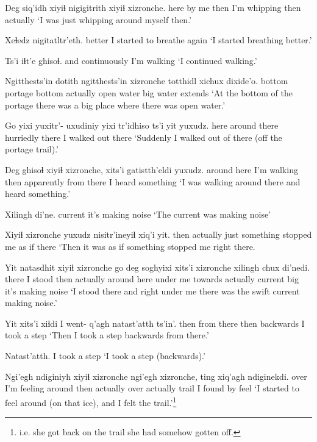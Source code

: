 \documentclass[12pt]{article}
\begin{document}
\gll Deg siq'idh xiyiɬ  nigigitrith xiyiɬ xizronche.
here {by me} then {I'm whipping} then actually
\glt `I was just whipping around myself then.'
\glend

\gll Xeɬedz nigitatltr'eth.
better {I started to breathe again}
\glt `I started breathing better.'
\glend

\gll Ts'i iɬt'e ghisoɬ.
and  continuously {I'm walking}
\glt `I continued walking.'
\glend

\gll Ngitthests'in dotith ngitthests'in xizronche totthidl xichux dixide'o.
bottom        portage bottom       actually        {open water} big  {water extends}
\glt `At the bottom of the portage there was a big place where there was open water.'
\glend

\gll Go   yixi           yuxitr'- uxudiniy yixi tr'idhiso ts'i yit yuxudz.
here {around there} {}       hurriedly there {I walked out} {} there
\glt `Suddenly I walked out of there (off the portage trail).'
\glend

\gll Deg ghisoɬ xiyiɬ xizronche,  xits'i {gatistth'eldi} yuxudz.  
{around here} {I'm walking} then  apparently                    {from there} {I heard something}
\glt `I was walking around there and heard something.'
\glend

\gll Xilingh di'ne. 
current {it's making noise}
\glt `The current was making noise'
\glend

\gll Xiyiɬ xizronche yuxudz nisitr'ineyiɬ xiq'i yit. 
then  actually     just       {something stopped me} {as if} there
\glt `Then it was as if something stopped me right there.
\glend

\gll Yit natasdhit xiyiɬ xizronche {go deg} soghyixi xits'i xizronche xilingh chux di'nedi. 
there {I stood} then  actually      {around here} {under me} towards actually current big {it's making noise}
\glt `I stood there and right under me there was the swift current making noise.'
\glend

\gll Yit xits'i xiɬdi {I went-} q'agh natast'atth ts'in'. 
then {from there} then {}  backwards {I took a step} {} 
\glt `Then I took a step backwards from there.'
\glend

\gll  Natast'atth.
 {I took a step}
\glt `I took a step (backwards).'
\glend

\gll Ngi'egh ndiginiyh xiyiɬ xizronche ngi'egh xizronche, ting {xiq'agh ndiginekdi.} 
over    {I'm feeling around} then actually over actually trail {I found by feel}
\glt `I started to feel around (on that ice), and I felt the trail.'\footnote{i.e. she got back on the trail she had somehow gotten off.}
\glend
\end{document}
